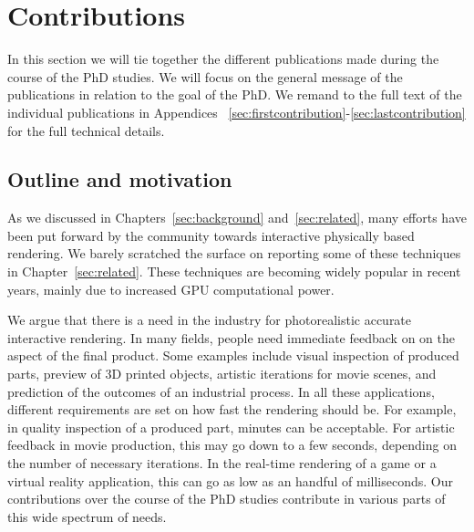 \chapter{Contributions}
\label{sec:contributions}


In this section we will tie together the different publications made during the course of the PhD studies. We will focus on the general message of the publications in relation to the goal of the PhD. We remand to the full text of the individual publications in Appendices~ \ref{sec:firstcontribution}-\ref{sec:lastcontribution} for the full technical details.

\section{Outline and motivation}


As we discussed in Chapters~\ref{sec:background} and~\ref{sec:related}, many efforts have been put forward by the community towards interactive physically based rendering. We barely scratched the surface on reporting some of these techniques in Chapter~\ref{sec:related}. These techniques are becoming widely popular in recent years, mainly due to increased GPU computational power. 

We argue that there is a need in the industry for photorealistic accurate interactive rendering. In many fields, people need immediate feedback on on the aspect of the final product. Some examples include visual inspection of produced parts, preview of 3D printed objects, artistic iterations for movie scenes, and prediction of the outcomes of an industrial process. In all these applications, different requirements are set on how fast the rendering should be. For example, in quality inspection of a produced part, minutes can be acceptable. For artistic feedback in movie production, this may go down to a few seconds, depending on the number of necessary iterations. In  the real-time rendering of a game or a virtual reality application, this can go as low as an handful of milliseconds. Our contributions over the course of the PhD studies contribute in various parts of this wide spectrum of needs.

